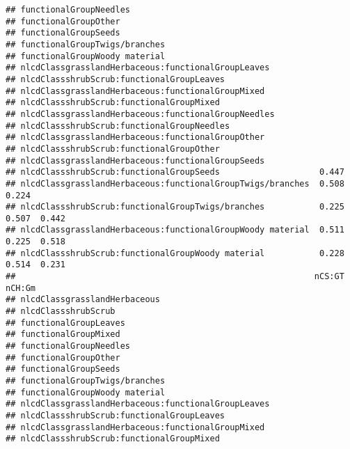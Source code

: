 \documentclass[]{article}
\begin{document}
\begin{verbatim}
## functionalGroupNeedles                                                         
## functionalGroupOther                                                           
## functionalGroupSeeds                                                           
## functionalGroupTwigs/branches                                                  
## functionalGroupWoody material                                                  
## nlcdClassgrasslandHerbaceous:functionalGroupLeaves                             
## nlcdClassshrubScrub:functionalGroupLeaves                                      
## nlcdClassgrasslandHerbaceous:functionalGroupMixed                              
## nlcdClassshrubScrub:functionalGroupMixed                                       
## nlcdClassgrasslandHerbaceous:functionalGroupNeedles                            
## nlcdClassshrubScrub:functionalGroupNeedles                                     
## nlcdClassgrasslandHerbaceous:functionalGroupOther                              
## nlcdClassshrubScrub:functionalGroupOther                                       
## nlcdClassgrasslandHerbaceous:functionalGroupSeeds                              
## nlcdClassshrubScrub:functionalGroupSeeds                    0.447              
## nlcdClassgrasslandHerbaceous:functionalGroupTwigs/branches  0.508  0.224       
## nlcdClassshrubScrub:functionalGroupTwigs/branches           0.225  0.507  0.442
## nlcdClassgrasslandHerbaceous:functionalGroupWoody material  0.511  0.225  0.518
## nlcdClassshrubScrub:functionalGroupWoody material           0.228  0.514  0.231
##                                                            nCS:GT nCH:Gm
## nlcdClassgrasslandHerbaceous                                            
## nlcdClassshrubScrub                                                     
## functionalGroupLeaves                                                   
## functionalGroupMixed                                                    
## functionalGroupNeedles                                                  
## functionalGroupOther                                                    
## functionalGroupSeeds                                                    
## functionalGroupTwigs/branches                                           
## functionalGroupWoody material                                           
## nlcdClassgrasslandHerbaceous:functionalGroupLeaves                      
## nlcdClassshrubScrub:functionalGroupLeaves                               
## nlcdClassgrasslandHerbaceous:functionalGroupMixed                       
## nlcdClassshrubScrub:functionalGroupMixed                                

\end{verbatim}
\end{document}
